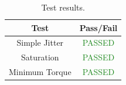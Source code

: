\begin{table}[htbp]
	\caption{Test results.}
	\label{tab:results}
	\centering \fontsize{10}{10}\selectfont
	\begin{tabular}{c | c } %
		\hline
		\textbf{Test} 				    & \textbf{Pass/Fail}  \\ \hline
		Simple Jitter  & \textcolor{ForestGreen}{PASSED}\\
		Saturation  & \textcolor{ForestGreen}{PASSED}   \\ 
		Minimum Torque  &\textcolor{ForestGreen}{PASSED}  \\ \hline
	\end{tabular}
\end{table}

\clearpage
